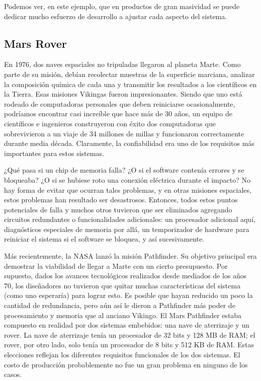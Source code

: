 \documentclass[output=paper, 
colorlinks,
citecolor=brown,
newtxmath
]{langscibook}
\begin{document}
Podemos ver, en este ejemplo, que en productos de gran masividad se puede dedicar 
mucho esfuerzo de desarrollo a ajustar cada aspecto del sistema.





\subsection {Mars Rover}

En 1976, dos naves espaciales no tripuladas llegaron al planeta Marte. 
Como parte de su misión, debían recolectar muestras de la superficie marciana, 
analizar la composición química de cada una y transmitir los resultados a los 
científicos en la Tierra. Esas misiones Vikingas fueron impresionantes. 
Siendo que uno está rodeado de computadoras personales que deben reiniciarse 
ocasionalmente, podríamos encontrar casi increíble que hace más de 30 años, 
un equipo de científicos e ingenieros construyeron con éxito dos computadoras 
que sobrevivieron a un viaje de 34 millones de millas y funcionaron 
correctamente durante media década. 
Claramente, la confiabilidad era uno de los requisitos más importantes para estos sistemas.

¿Qué pasa si un chip de memoria falla? ¿O si el software contenía errores y se bloqueaba? 
¿O si se hubiese roto una conexión eléctrica durante el impacto? 
No hay forma de evitar que ocurran tales problemas, y en otras misiones espaciales, 
estos problemas han resultado ser desastrosos. 
Entonces, todos estos puntos potenciales de falla y muchos otros 
tuvieron que ser eliminados agregando circuitos redundantes o 
funcionalidades adicionales:
un procesador adicional aquí, diagnósticos especiales de memoria por allá, 
un temporizador de hardware para reiniciar el sistema si el software se 
bloquea, y así sucesivamente.

Más recientemente, la NASA lanzó la misión Pathfinder. Su objetivo principal era 
demostrar la viabilidad de llegar a Marte con un cierto presupuesto. 
Por supuesto, dados los avances tecnológicos realizados desde mediados de 
los años 70, los diseñadores no tuvieron que quitar muchas características del sistema (como uno esperaría)
para lograr esto. Es posible que hayan reducido un poco la cantidad de 
redundancia, pero aún así le dieron a Pathfinder más poder de procesamiento y memoria
que al anciano Vikingo. El Mars Pathfinder estaba compuesto en realidad 
por dos sistemas embebidos: una nave de aterrizaje y un rover. 
La nave de aterrizaje tenía un procesador de 32 bits y 128 MB de RAM; 
el rover, por otro lado, solo tenía un procesador de 8 bits y 512 KB de RAM. 
Estas elecciones reflejan los diferentes requisitos funcionales de los dos 
sistemas. El costo de producción probablemente no fue un gran problema en 
ninguno de los casos.
\end{document}
